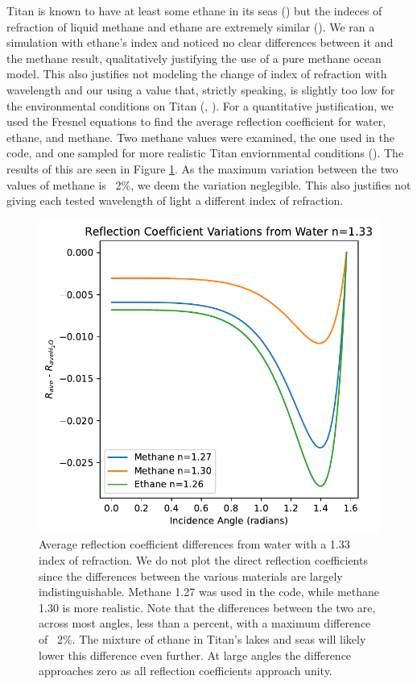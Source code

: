 \documentclass{article}
\begin{document}
Titan is known to have at least some ethane in its seas (\cite{Mastrogiuseppe2016}) but the indeces of refraction of liquid methane and ethane are extremely similar (\cite{Kanjanasakul2020}). We ran a simulation with ethane's index and noticed no clear differences between it and the methane result, qualitatively justifying the use of a pure methane ocean model. This also justifies not modeling the change of index of refraction with wavelength and our using a value that, strictly speaking, is slightly too low for the environmental conditions on Titan (\cite{Martonchik1994}, \cite{Jennings2019}). For a quantitative justification, we used the Fresnel equations to find the average reflection coefficient for water, ethane, and methane. Two methane values were examined, the one used in the code, and one sampled for more realistic Titan enviornmental conditions (\cite{Martonchik1994}). The results of this are seen in Figure \ref{fig:4}. As the maximum variation between the two values of methane is ~2\%, we deem the variation neglegible. This also justifies not giving each tested wavelength of light a different index of refraction. 

\begin{figure}[htb]
\includegraphics[scale = 0.5]{ReflectionVariations.pdf}
\centering
\caption{Average reflection coefficient differences from water with a 1.33 index of refraction. We do not plot the direct reflection coefficients since the differences between the various materials are largely indistinguishable. Methane 1.27 was used in the code, while methane 1.30 is more realistic. Note that the differences between the two are, across most angles, less than a percent, with a maximum difference of ~2\%. The mixture of ethane in Titan's lakes and seas will likely lower this difference even further. At large angles the difference approaches zero as all reflection coefficients approach unity.}
\label{fig:4}
\end{figure}
\end{document}

